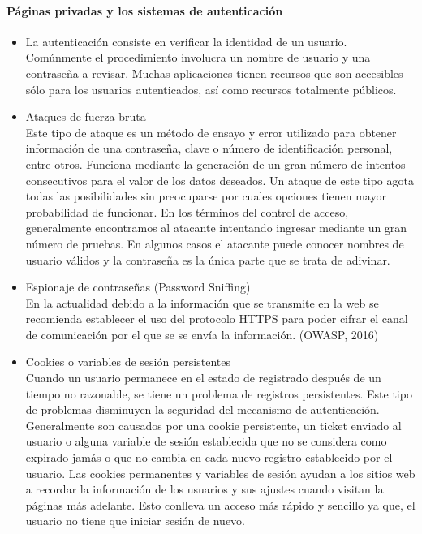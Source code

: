 \documentclass[12pt, a4paper, titlepage]{article}
\begin{document}
		\paragraph{Páginas privadas y los sistemas de autenticación}
		\begin{itemize}
		    \item La autenticación consiste en verificar la identidad de un usuario. Comúnmente el procedimiento involucra un nombre de usuario y una contraseña a revisar. Muchas aplicaciones tienen recursos que son accesibles sólo para los usuarios autenticados, así como recursos totalmente públicos.
		    
		    \item Ataques de fuerza bruta \\
		    Este tipo de ataque es un método de ensayo y error utilizado para obtener información de una contraseña, clave o número de identificación personal, entre otros. Funciona mediante la generación de un gran número de intentos consecutivos para el valor de los datos deseados. Un ataque de este tipo agota todas las posibilidades sin preocuparse por cuales opciones tienen mayor probabilidad de funcionar.
            En los términos del control de acceso, generalmente encontramos al atacante intentando ingresar mediante un gran número de pruebas. En algunos casos el atacante puede conocer nombres de usuario válidos y la contraseña es la única parte que se trata de adivinar.
            
            \item Espionaje de contraseñas (Password Sniffing)\\
            En la actualidad debido a la información que se transmite en la web se recomienda establecer el uso del protocolo HTTPS para poder cifrar el canal de comunicación por el que se se envía la información. (OWASP, 2016)
            
            \item Cookies o variables de sesión persistentes\\
            Cuando un usuario permanece en el estado de registrado después de un tiempo no razonable, se tiene un problema de registros persistentes.
            Este tipo de problemas disminuyen la seguridad del mecanismo de autenticación. \\
            Generalmente son causados por una cookie persistente, un ticket enviado al usuario o alguna variable de sesión establecida que no se considera como expirado jamás o que no cambia en cada nuevo registro establecido por el usuario.
            Las cookies permanentes y variables de sesión ayudan a los sitios web a recordar la información de los usuarios y sus ajustes cuando visitan la páginas más adelante. Esto conlleva un acceso más rápido y sencillo ya que, el usuario no tiene que iniciar sesión de nuevo.
            
		\end{itemize}
		
\end{document}
